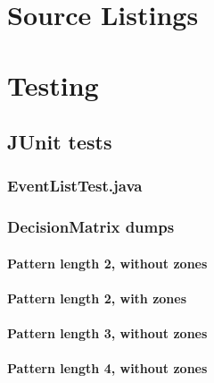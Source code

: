 \newpage
\appendix

\chapter{Source Listings}


\chapter{Testing}

\section{JUnit tests}
\subsection{EventListTest.java}


\subsection{DecisionMatrix dumps}
\subsubsection{Pattern length 2, without zones}

\subsubsection{Pattern length 2, with zones}

\subsubsection{Pattern length 3, without zones}

\subsubsection{Pattern length 4, without zones}



